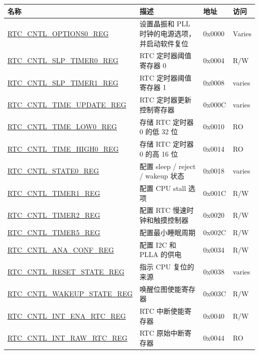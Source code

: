 \begin{longtable}{ | l | l | p{1.3cm} | p{1cm} | }
\hline\rowcolor{lightgray}
\textbf{名称} & \textbf{描述} &  \textbf{地址} & \textbf{访问} \\\hline
\endhead
\hyperref[regdesc:RTCCNTLOPTIONS0REG]{RTC\_CNTL\_OPTIONS0\_REG} & 设置晶振和 PLL 时钟的电源选项，并启动软件复位  & 0x0000 & Varies \\ \hline
\hyperref[regdesc:RTCCNTLSLPTIMER0REG]{RTC\_CNTL\_SLP\_TIMER0\_REG} & RTC 定时器阈值寄存器 0 & 0x0004 & R/W \\ \hline
\hyperref[regdesc:RTCCNTLSLPTIMER1REG]{RTC\_CNTL\_SLP\_TIMER1\_REG} & RTC 定时器阈值寄存器 1 & 0x0008 & varies \\ \hline
\hyperref[regdesc:RTCCNTLTIMEUPDATEREG]{RTC\_CNTL\_TIME\_UPDATE\_REG} & RTC 定时器更新控制寄存器 & 0x000C & varies \\ \hline
\hyperref[regdesc:RTCCNTLTIMELOW0REG]{RTC\_CNTL\_TIME\_LOW0\_REG} & 存储 RTC 定时器 0 的低 32 位 & 0x0010 & RO \\ \hline
\hyperref[regdesc:RTCCNTLTIMEHIGH0REG]{RTC\_CNTL\_TIME\_HIGH0\_REG} & 存储 RTC 定时器 0 的高 16 位 & 0x0014 & RO \\ \hline
\hyperref[regdesc:RTCCNTLSTATE0REG]{RTC\_CNTL\_STATE0\_REG} & 配置 sleep / reject / wakeup 状态 & 0x0018 & varies \\ \hline
\hyperref[regdesc:RTCCNTLTIMER1REG]{RTC\_CNTL\_TIMER1\_REG} & 配置 CPU stall 选项 & 0x001C & R/W \\ \hline
\hyperref[regdesc:RTCCNTLTIMER2REG]{RTC\_CNTL\_TIMER2\_REG} & 配置 RTC 慢速时钟和触摸控制器 & 0x0020 & R/W \\ \hline
\hyperref[regdesc:RTCCNTLTIMER5REG]{RTC\_CNTL\_TIMER5\_REG} & 配置最小睡眠周期 & 0x002C & R/W \\ \hline
\hyperref[regdesc:RTCCNTLANACONFREG]{RTC\_CNTL\_ANA\_CONF\_REG} & 配置 I2C 和 PLLA 的供电 & 0x0034 & R/W \\ \hline
\hyperref[regdesc:RTCCNTLRESETSTATEREG]{RTC\_CNTL\_RESET\_STATE\_REG} & 指示 CPU 复位的来源 & 0x0038 & varies \\ \hline
\hyperref[regdesc:RTCCNTLWAKEUPSTATEREG]{RTC\_CNTL\_WAKEUP\_STATE\_REG} & 唤醒位图使能寄存器 & 0x003C & R/W \\ \hline
\hyperref[regdesc:RTCCNTLINTENARTCREG]{RTC\_CNTL\_INT\_ENA\_RTC\_REG} & RTC 中断使能寄存器 & 0x0040 & R/W \\ \hline
\hyperref[regdesc:RTCCNTLINTRAWRTCREG]{RTC\_CNTL\_INT\_RAW\_RTC\_REG} & RTC 原始中断寄存器 & 0x0044 & RO \\ \hline

\end{longtable}
